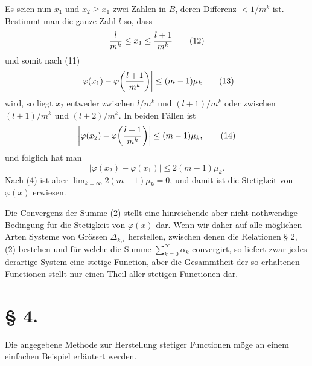 Es seien nun $x_1$ und $x_2\ge x_1$ zwei Zahlen in $B$, deren Differenz $<1/m^k$ ist. Bestimmt man die ganze Zahl $l$ so, dass
\begin{equation}
 {l\over m^k}\le x_1\le {l+1\over m^k}
\tag{12}
\end{equation}
und somit nach (11)
\begin{equation}
 \left|\varphi(x_1)-\varphi\!\left({l+1\over m^k}\right)\right|\le(m-1)\mu_k
\tag{13}
\end{equation}
wird, so liegt $x_2$ entweder zwischen $l/m^k$ und $(l+1)/m^k$ oder zwischen $(l+1)/m^k$ und $(l+2)/m^k$. In beiden Fällen ist
\begin{equation}
 \left|\varphi(x_2)-\varphi\!\left({l+1\over m^k}\right)\right|\le(m-1)\mu_k,
\tag{14}
\end{equation}
und folglich hat man
\begin{equation}
 |\varphi(x_2)-\varphi(x_1)|\le 2(m-1)\mu_k.
\tag{14'}
\end{equation}
Nach (4) ist aber $\lim_{k=\infty}2(m-1)\mu_k=0$, und damit ist die Stetigkeit von $\varphi(x)$ erwiesen.

Die Convergenz der Summe (2) stellt eine hinreichende aber nicht nothwendige Bedingung für die Stetigkeit von $\varphi(x)$ dar. Wenn wir daher auf alle möglichen Arten Systeme von Grössen $\Delta_{k,l}$ herstellen, zwischen denen die Relationen § 2, (2) bestehen und für welche die Summe $\sum_{k=0}^{\infty}\alpha_k$ convergirt, so liefert zwar jedes derartige System eine stetige Function, aber die Gesammtheit der so erhaltenen Functionen stellt nur einen Theil aller stetigen Functionen dar.

\section*{§ 4.}

Die angegebene Methode zur Herstellung stetiger Functionen möge an einem einfachen Beispiel erläutert werden.

